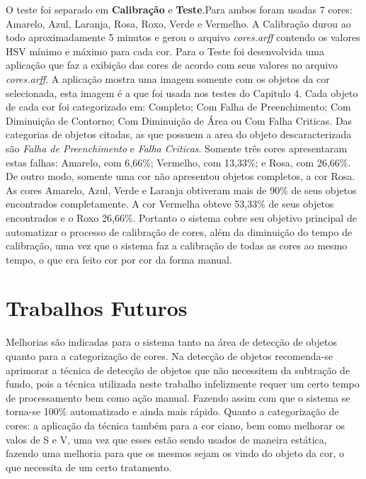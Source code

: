 O teste foi separado em \textbf{Calibração} e \textbf{Teste}.Para ambos foram usadas 7 cores: Amarelo, Azul, Laranja, Rosa, Roxo, Verde e Vermelho. A Calibração durou ao todo aproximadamente 5 minutos e gerou o arquivo \textit{cores.arff} contendo os valores HSV mínimo e máximo para cada cor. Para o Teste foi desenvolvida uma aplicação que faz a exibição das cores de acordo com seus valores no arquivo \textit{cores.arff}. A aplicação mostra uma imagem somente com os objetos da cor selecionada, esta imagem é a que foi usada nos testes do Capitulo 4. Cada objeto de cada cor foi categorizado em: Completo; Com Falha de Preenchimento; Com Diminuição de Contorno; Com Diminuição de Área ou Com Falha Criticas. Das categorias de objetos citadas, as que possuem a area do objeto descaracterizada são \textit{Falha de Preenchimento} e \textit{Falha Criticas}. Somente tr\^{e}s cores apresentaram estas falhas: Amarelo, com 6,66\%; Vermelho, com 13,33\%; e Rosa, com 26,66\%. De outro modo, somente uma cor não apresentou objetos completos, a cor Rosa. As cores Amarelo, Azul, Verde e Laranja obtiveram mais de 90\% de seus objetos encontrados completamente. A cor Vermelha obteve 53,33\% de seus objetos encontrados e o Roxo 26,66\%. 
Portanto o sistema cobre seu objetivo principal de automatizar o processo de calibração de cores, além da diminuição do tempo de calibração, uma vez que o sistema faz a calibração de todas as cores ao mesmo tempo, o que era feito cor por cor da forma manual.	

\section{Trabalhos Futuros}
Melhorias são indicadas para o sistema tanto na área de detecção de objetos quanto para a categorização de cores. Na detecção de objetos recomenda-se aprimorar a técnica de detecção de objetos que não necessitem da subtração de fundo, pois a técnica utilizada neste trabalho infelizmente requer um certo tempo de processamento bem como ação manual. Fazendo assim com que o sistema se torna-se 100\% automatizado e ainda mais rápido. Quanto a categorização de cores: a aplicação da técnica também para a cor ciano, bem como melhorar os valos de S e V, uma vez que esses estão sendo usados de maneira estática, fazendo uma melhoria para que os mesmos sejam os vindo do objeto da cor, o que necessita de um certo tratamento.